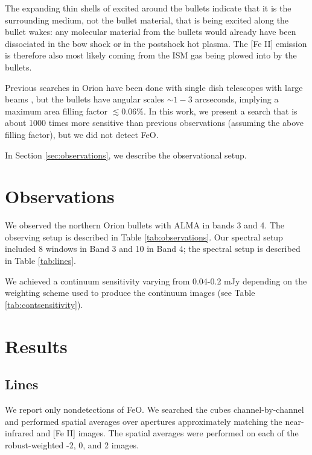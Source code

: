 \documentclass[twocolumn]{aastex61}
\begin{document}
The expanding thin shells of excited \hh around the bullets indicate that it is
the surrounding medium, not the bullet material, that is being excited along
the bullet wakes: any molecular material from the bullets would already have
been dissociated in the bow shock or in the postshock hot plasma.  The [Fe II]
emission is therefore also most likely coming from the ISM gas being plowed
into by the bullets.  

Previous searches in Orion have been done with single dish telescopes with
large beams \citep[40\arcsec;][]{Merer1982a}, but the bullets have angular
scales $\sim1-3$ arcseconds, implying a maximum area filling factor
$\lesssim0.06\%$.  In this work, we present a search that is about 1000 times more
sensitive than previous observations (assuming the above filling factor),
but we did not detect FeO.

In Section \ref{sec:observations}, we describe the observational setup.


\section{Observations}

We observed the northern Orion bullets with ALMA in bands 3 and 4.
The observing setup is described in Table \ref{tab:observations}.
Our spectral setup included 8 windows in Band 3 and 10 in Band 4;
the spectral setup is described in Table \ref{tab:lines}.





We achieved a continuum sensitivity varying from 0.04-0.2 mJy depending on the
weighting scheme used to produce the continuum images (see Table
\ref{tab:contsensitivity}).



\section{Results}
\subsection{Lines}
We report only nondetections of FeO.  We searched the cubes channel-by-channel
and performed spatial averages over apertures approximately matching the
near-infrared \hh and [Fe II] images.  The spatial averages were performed
on each of the robust-weighted -2, 0, and 2 images.
\end{document}
